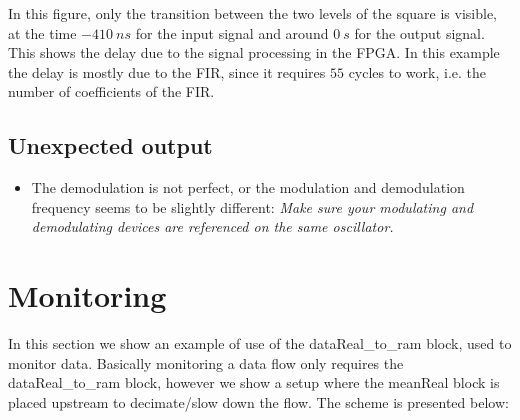 \documentclass[12pt,oneside]{article}
\begin{document}
In this figure, only the transition between the two levels of the square is visible, at the time $-410~ns$ for the input signal and around $0~s$ for the output signal. This shows the delay due to the signal processing in the FPGA. In this example the delay is mostly due to the FIR, since it requires $55$ cycles to work, i.e. the number of coefficients of the FIR.

\subsection{Unexpected output}

\begin{itemize}
	\setlength\itemsep{-0.0cm}
	\item The demodulation is not perfect, or the modulation and demodulation frequency seems to be slightly different: \newline \hspace*{1cm}  \textit{Make sure your modulating and demodulating devices are referenced on the same oscillator.}
\end{itemize}

\section{Monitoring}\label{sect:Monitoring}

In this section we show an example of use of the dataReal\_to\_ram block, used to monitor data. Basically monitoring a data flow only requires the dataReal\_to\_ram block, however we show a setup where the meanReal block is placed upstream to decimate/slow down the flow. The scheme is presented below:
 
\begin{center}
\end{center}
\end{document}

